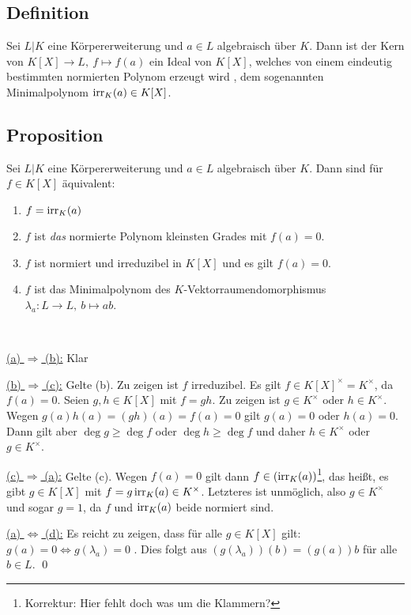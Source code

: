 \subsection{Definition} Sei $L|K$ eine Körpererweiterung und $a \in L$ algebraisch über $K$. Dann ist der Kern von $K[X] \to L,~f \mapsto f(a)$ ein Ideal von $K[X]$, welches von einem eindeutig bestimmten normierten Polynom erzeugt wird , dem sogenannten Minimalpolynom $\operatorname{irr}_K(a) \in K[X]$.

\subsection{Proposition} Sei $L|K$ eine Körpererweiterung und $a \in L$ algebraisch über $K$. Dann sind für $f \in K[X]$ äquivalent:
\begin{enumerate}[label=(\alph*)]
	\item
		$f = \operatorname{irr}_K(a)$
		
	\item
		$f$ ist \textit{das} normierte Polynom kleinsten Grades mit $f(a)=0$.
		
	\item
		$f$ ist normiert und irreduzibel in $K[X]$ und es gilt $f(a)=0$.
		
	\item
		$f$ ist das Minimalpolynom des $K$-Vektorraumendomorphismus $\lambda_a : L \to L,~b \mapsto ab$.
\end{enumerate}

\proof ~

\underline{(a) $\Longrightarrow$ (b):} Klar

\underline{(b) $\Longrightarrow$ (c):} Gelte (b). Zu zeigen ist $f$ irreduzibel. Es gilt $f \in K[X]^\times = K^\times$, da $f(a)=0$. Seien $g,h \in K[X]$ mit $f = gh$. Zu zeigen ist $g \in K^\times$ oder $h \in K^\times$. Wegen $g(a)h(a) = (gh)(a) = f(a) = 0$ gilt $g(a) = 0$ oder $h(a) = 0$. Dann gilt aber $\deg g \geq \deg f$ oder $\deg h \geq \deg f$ und daher $h \in K^\times$ oder $g \in K^\times$.

\underline{(c) $\Longrightarrow$ (a):} Gelte (c). Wegen $f(a) = 0$ gilt dann $f \in (\operatorname{irr}_K(a))$\footnote{Korrektur: Hier fehlt doch was um die Klammern?}, das heißt, es gibt $g \in K[X]$ mit $f = g \operatorname{irr}_K(a) \in K^\times$. Letzteres ist unmöglich, also $g\in K^\times$ und sogar $g=1$, da $f$ und $\operatorname{irr}_K(a)$ beide normiert sind.

\underline{(a) $\iff$ (d):} Es reicht zu zeigen, dass für alle $g \in K[X]$ gilt: $g(a) = 0 \iff g(\lambda_a) = 0$ . Dies folgt aus $(g(\lambda_a))(b) = (g(a))b$ für alle $b \in L$. \qed


